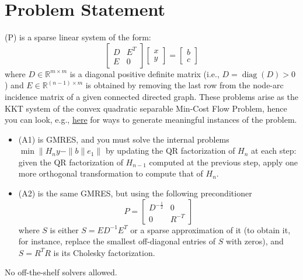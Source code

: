 \documentclass{article}
\begin{document}
\maketitle

\tableofcontents
 \section{Problem Statement}
 \begin{framed}
 (P) is a sparse linear system of the form:
 \[
 \begin{bmatrix} \label{eq:1}
D & E^T\\
E & 0
\end{bmatrix}
\begin{bmatrix}
x\\y
\end{bmatrix}
=
\begin{bmatrix}
b\\c
\end{bmatrix}
 \]
 where $D\in\mathbb{R}^{m\times m}$ is a diagonal positive definite matrix (i.e., $D = \operatorname{diag}( D ) > 0$
) and $E\in\mathbb{R}^{(n-1)\times m}$ is obtained by removing the last row from the node-arc incidence matrix of a given connected directed graph. These problems arise as the KKT system of the convex quadratic separable Min-Cost Flow Problem, hence you can look, e.g., \href{https://commalab.di.unipi.it/datasets/mcf}{here} for ways to generate meaningful instances of the problem.\medskip
\begin{itemize}
 \item 
(A1) is GMRES, and you must solve the internal problems $\min \bigl\| H_n y - \|b\| e_1 \bigr\|$
 by updating the QR factorization of $H_n$
 at each step: given the QR factorization of $H_{n-1}$
 computed at the previous step, apply one more orthogonal transformation to compute that of $H_n$.
\item (A2) is the same GMRES, but using the following preconditioner
$$P = \begin{bmatrix}
     D^{-\frac12} & 0\\
     0 & R^{-T}
    \end{bmatrix}$$
    where $S$
 is either $S=ED^{-1}E^T$
 or a sparse approximation of it (to obtain it, for instance, replace the smallest off-diagonal entries of $S$
 with zeros), and $S = R^TR$ is its Cholesky factorization.

\end{itemize}
No off-the-shelf solvers allowed.

 \end{framed}
\newpage
\end{document}
